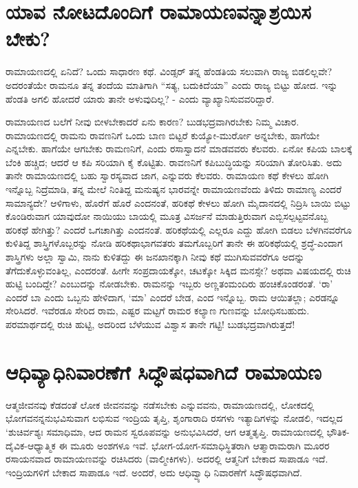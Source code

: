 \section*{ಯಾವ ನೋಟದೊಂದಿಗೆ ರಾಮಾಯಣವನ್ನಾಶ್ರಯಿಸ ಬೇಕು?}

ರಾಮಾಯಣದಲ್ಲಿ ಏನಿದೆ? ಒಂದು ಸಾಧಾರಣ ಕಥೆ. ವಿಂಡ್ಸರ್ ತನ್ನ ಹೆಂಡತಿಯ ಸಲುವಾಗಿ ರಾಜ್ಯ ಬಿಡಲಿಲ್ಲವೇ? ಅದರಂತೆಯೇ ರಾಮನೂ ತನ್ನ ತಂದೆಯ ಮಾತಿಗಾಗಿ ``ಸತ್ಯ, ಬದುಕಿದೆಯಾ'' ಎಂದು ರಾಜ್ಯ ಬಿಟ್ಟು ಹೋದ. ಇನ್ನು ಹೆಂಡತಿ ಅಗಲಿ ಹೋದರೆ ಯಾರು ತಾನೇ ಅಳುವುದಿಲ್ಲ? - ಎಂದು ವ್ಯಾಖ್ಯಾನಿಸುವವರಿದ್ದಾರೆ.

ರಾಮಾಯಣದ ಬಲೆಗೆ ನೀವು ಬೀಳಬೇಕಾದರೆ ಏನು ಕಾರಣ? ಬುಡಭದ್ರವಾಗಿರಬೇಕು ನಿಮ್ಮ ವಿಚಾರ. ರಾಮಾಯಣದಲ್ಲಿ ರಾಮನು ರಾವಣನಿಗೆ ಒಂದು ಬಾಣ ಬಿಟ್ಟರೆ ಕುಯ್ಯೋ-ಮುರ್ರೋ ಅನ್ನಬೇಕು, ಹಾಗೆಯೇ ಎನ್ನಬೇಕು. ಹಾಗೆಯೇ ಆಗಬೇಕು ರಾಮಣನಿಗೆ, ಎಂದು ರಸಾಸ್ವಾದನೆ ಮಾಡವವರು ಕೆಲವರು. ಏನೋ ಕಪಿಯ ಬಾಲಕ್ಕೆ ಬೆಂಕಿ ಹಚ್ಚಿದ; ಆದರೆ ಆ ಕಪಿ ಸರಿಯಾಗಿ ಕೈ ಕೊಟ್ಟಿತು. ರಾವಣನಿಗೆ ಕಪಿಬುದ್ಧಿಯನ್ನು ಸರಿಯಾಗಿ ತೋರಿಸಿತು. ಅದು ತಾನೇ ರಾಮಾಯಣದಲ್ಲಿ ಬಹು ಸ್ವಾರಸ್ಯವಾದ ಜಾಗ, ಎನ್ನುವರು ಕೆಲವರು. ರಾಮಾಯಣ ಕಥೆ ಕೇಳಲು ಹೋಗಿ ಇನ್ನೊಬ್ಬ ನಿದ್ರೆಮಾಡಿ, ತನ್ನ ಮೇಲೆ ನಿಂತಿದ್ದ ಮನುಷ್ಯನ ಭಾರವನ್ನೇ ರಾಮಾಯಣವೆಂದು ತಿಳಿದು ರಾಮಾಣ್ಯ ಎಂದರೆ ಸಾಮಾನ್ಯದೇ? ಆಳಿಗಾಳು, ಹೊರೆಗೆ ಹೊರೆ ಎಂದನಂತೆ, ಹರಿಕಥೆ ಕೇಳಲು ಹೋಗಿ ಮೈದಾನದಲ್ಲಿ ನಿದ್ರಿಸಿ ಬಾಯಿ ಬಿಟ್ಟು  ಕೊಂಡಿರುವಾಗ ಯಾವುದೋ ನಾಯಿಯು ಬಾಯಲ್ಲಿ ಮೂತ್ರ ವಿಸರ್ಜನೆ ಮಾಡುತ್ತಿರುವಾಗ ಎಬ್ಬಿಸಲ್ಪಟ್ಟವನೊಬ್ಬ ಹರಿಕಥೆ ಹೇಗಿತ್ತು? ಎಂದರೆ ಒಗಚಾಗಿತ್ತು ಎಂದನಂತೆ. ಹರಿಕಥೆಯಲ್ಲಿ ಎಲ್ಲರೂ ಎದ್ದು ಹೋಗಿ ಬಿಡಲು ಬೆಳಗಿನವರೆಗೂ ಕುಳಿತಿದ್ದ ಶಾಸ್ತ್ರಿಗಳೊಬ್ಬರನ್ನು ನೋಡಿ ಹರಿಕಥಾಭಾಗವತರು ತಮಗೊಬ್ಬರಿಗೆ ತಾನೇ ಈ ಹರಿಕಥೆಯಲ್ಲಿ ಶ್ರದ್ಧೆ-ಎಂದಾಗ ಶಾಸ್ತ್ರಿಗಳು ಅಲ್ಲಾ ಸ್ವಾಮಿ, ನಾನು ಕುಳಿತದ್ದು ಈ ಜನಖಾನಕ್ಕಾಗಿ ನೀವು ಕಥೆ ಮುಗಿಸುವವರೆಗೂ ಅದನ್ನು ತೆಗೆದುಕೊಳ್ಳುವಂತಿಲ್ಲ, ಎಂದರಂತೆ. ಹೀಗೇ ಸಂಪ್ರದಾಯಕ್ಕೋ, ಚಟಕ್ಕೋ ಸಿಕ್ಕಿದ ಮನಸ್ಸೇ? ಅಥವಾ ವಿಷಯದಲ್ಲಿ ರುಚಿ ಹುಟ್ಟಿ ಬಂದಿದ್ದೇ? ಎಂಬುದನ್ನು ನೋಡಬೇಕು. ರಾಮನನ್ನು ಇಬ್ಬರು ಅಣ್ಣತಂಮಂದಿರು ಹಂಚಿಕೊಂಡರಂತೆ. `ರಾ' ಎಂದರೆ ಬಾ ಎಂದು ಒಬ್ಬನು ಹೇಳಿದಾಗ, `ಮಾ' ಎಂದರೆ ಬೇಡ, ಎಂದ ಇನ್ನೊಬ್ಬ. ರಾಮ ಆಯಿತಲ್ಲಾ; ಎರಡನ್ನೂ ಸೇರಿಸಿದರೆ. ಇವೆರಡೂ ಸೇರಿದ ರಾಮ, ಎಷ್ಟರ ಮಟ್ಟಗೆ ರಾಮರ ಕಲ್ಯಾಣ ಗುಣವನ್ನು ಬೋಧಿಸಬಹುದು. ಪರಮಾರ್ಥದಲ್ಲಿ ರುಚಿ ಹುಟ್ಟಿ, ಅದರಿಂದ ಬೆಳೆಯುವ ವಿಶ್ವಾಸ ತಾನೇ ಗಟ್ಟಿ! ಬುಡಭದ್ರವಾಗಿರುತ್ತದೆ!

\section*{ಆಧಿವ್ಯಾಧಿನಿವಾರಣೆಗೆ ಸಿದ್ಧೌಷಧವಾಗಿದೆ ರಾಮಾಯಣ}

ಆತ್ಮಜೀವನವು ಕೆಡದಂತೆ ಲೋಕ ಜೀವನವನ್ನು ನಡೆಸಬೇಕು ಎನ್ನುವವನು, ರಾಮಾಯಣದಲ್ಲಿ, ಲೋಕದಲ್ಲಿ ಭೋಗವನನ್ನನುಭವಿಸುವಾಗ ಲಭಿಸುವ ಇಂದ್ರಿಯ ತೃಪ್ತಿ, ಶೃಂಗಾರಾದಿ ರಸಗಳು ಇತ್ಯಾದಿಗಳನ್ನು ನೋಡಲಿ, ಇದಲ್ಲದ `ಶುಚಿರ್ವಶ್ಯಃ ಸಮಾಧಿಮಾ, ಆದ ರಾಮನ ಸ್ವರೂಪವನ್ನು ಅನುಭವಿಸಿದರೆ, ಆಗ ಆತ್ಮತೃಪ್ತಿ. ರಾಮಾಯಣದಲ್ಲಿ ಭೌತಿಕ-ದೈವಿಕ-ಆಧ್ಯಾತ್ಮಿಕ ಈ ಮೂರು ಅಂಶಗಳೂ ಇವೆ. ಭೋಗ-ಯೋಗ-ಸಮಾಧಿಸ್ಥಿತರಾಗಿ ಆತ್ಮಾರಾಮರಾಗಿ ಮೂರರ ರಸಾಯನವಾದ ರಾಮಾಯಣವನ್ನು ರಚಿಸಿದರು (ವಾಲ್ಮೀಕಿಗಳು). ಅದರಲ್ಲಿ ಆತ್ಮನಿಗೆ ಬೇಕಾದ ಸಾಪಾಡೂ ಇದೆ. ಇಂದ್ರಿಯಗಳಿಗೆ ಬೇಕಾದ ಸಾಪಾಡೂ ಇದೆ. ಅಂದರೆ, ಅದು ಆಧಿವ್ವ್ಯಾಧಿ ನಿವಾರಣೆಗೆ ಸಿದ್ಧೌಷಧವಾಗಿದೆ.  

